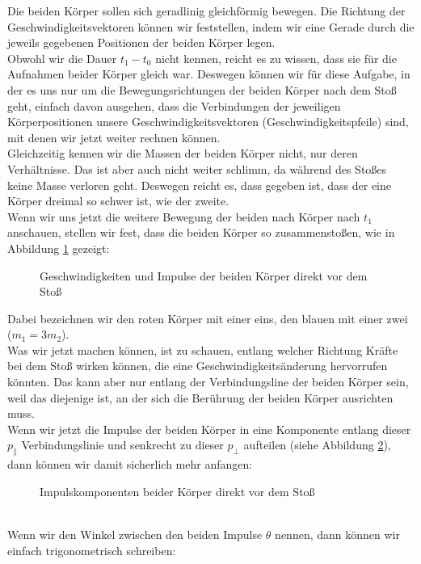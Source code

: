 \begin{Answer}[ref = col1]
	Die beiden Körper sollen sich geradlinig gleichförmig bewegen. Die Richtung der Geschwindigkeitsvektoren können wir feststellen, indem wir eine Gerade durch die jeweils gegebenen Positionen der beiden Körper legen. \\
	Obwohl wir die Dauer $t_1-t_0$ nicht kennen, reicht es zu wissen, dass sie für die Aufnahmen beider Körper gleich war. Deswegen können wir für diese Aufgabe, in der es uns nur um die Bewegungsrichtungen der beiden Körper nach dem Stoß geht, einfach davon ausgehen, dass die Verbindungen der jeweiligen Körperpositionen unsere Geschwindigkeitsvektoren (\glqq Geschwindigkeitspfeile\grqq) sind, mit denen wir jetzt weiter rechnen können.\\
	Gleichzeitig kennen wir die Massen der beiden Körper nicht, nur deren Verhältnisse. Das ist aber auch nicht weiter schlimm, da während des Stoßes keine Masse verloren geht. Deswegen reicht es, dass gegeben ist, dass der eine Körper dreimal so schwer ist, wie der zweite.\\
	Wenn wir uns jetzt die weitere Bewegung der beiden nach Körper nach $t_1$ anschauen, stellen wir fest, dass die beiden Körper so zusammenstoßen, wie in Abbildung \ref{col1:colfi}
	gezeigt:
	\begin{figure}[h]
		\centering
		
		\caption{Geschwindigkeiten und Impulse der beiden Körper direkt vor dem Stoß}
		\label{col1:colfi}
	\end{figure}
	Dabei bezeichnen wir den roten Körper mit einer eins, den blauen mit einer zwei ($m_1 = 3m_2$).\\
	Was wir jetzt machen können, ist zu schauen, entlang welcher Richtung Kräfte bei dem Stoß wirken können, die eine Geschwindigkeitsänderung hervorrufen könnten. Das kann aber nur entlang der Verbindungsline der beiden Körper sein, weil das diejenige ist, an der sich die Berührung der beiden Körper ausrichten muss.\\
	Wenn wir jetzt die Impulse der beiden Körper in eine Komponente entlang dieser $p_\parallel$ Verbindungslinie und senkrecht zu dieser $p_\bot$ aufteilen (siehe Abbildung \ref{col1:colcom}), dann können wir damit sicherlich mehr anfangen:
	\begin{figure}[h]
		\centering
		
		\caption{Impulskomponenten beider Körper direkt vor dem Stoß}
		\label{col1:colcom}
	\end{figure}\\
	Wenn wir den Winkel zwischen den beiden Impulse $\theta$ nennen, dann können wir einfach trigonometrisch schreiben:

\end{Answer}
